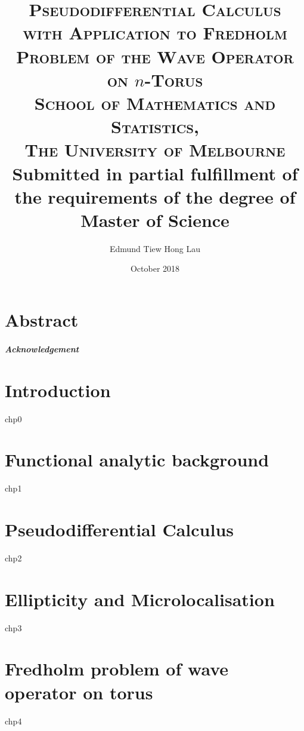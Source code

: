 \documentclass[12pt, twoside]{book}
\title{    
    \textsc{\LARGE Pseudodifferential Calculus} \\
    \textsc{\large with Application to Fredholm Problem of the Wave Operator on $n$-Torus} \\ [5em]
    \textsc{\Large School of Mathematics and Statistics, \\ The University of Melbourne} \\ [5em]
    {\large Submitted in partial fulfillment of the requirements of the degree of Master of Science} \\
}
\author{Edmund Tiew Hong Lau}
\date{October 2018}
\begin{document}
\maketitle



\chapter*{Abstract}




\paragraph{\LARGE Acknowledgement} \hfill 

\tableofcontents
\chapter{Introduction}
{chp0}


\chapter{Functional analytic background}
{chp1}

\chapter{Pseudodifferential Calculus}
{chp2}

\chapter{Ellipticity and Microlocalisation}
{chp3}

\chapter{Fredholm problem of wave operator on torus}
{chp4}



\end{document}
